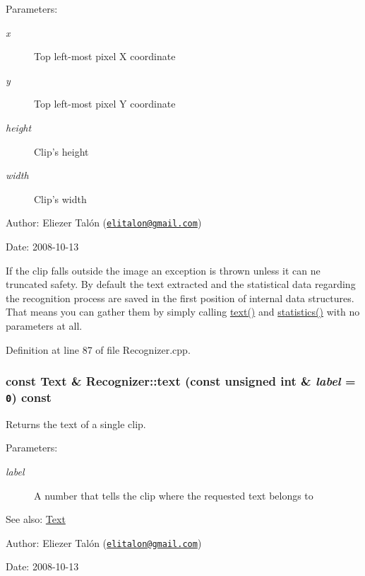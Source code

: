 \begin{Desc}
\item[Parameters:]
\begin{description}
\item[{\em x}]Top left-most pixel X coordinate \item[{\em y}]Top left-most pixel Y coordinate \item[{\em height}]Clip's height \item[{\em width}]Clip's width\end{description}
\end{Desc}
\begin{Desc}
\item[Author:]Eliezer Talón (\href{mailto:elitalon@gmail.com}{\tt elitalon@gmail.com}) \end{Desc}
\begin{Desc}
\item[Date:]2008-10-13\end{Desc}
If the clip falls outside the image an exception is thrown unless it can ne truncated safety. By default the text extracted and the statistical data regarding the recognition process are saved in the first position of internal data structures. That means you can gather them by simply calling \hyperlink{class_recognizer_c5d20b511888a60a6c1a81c0a4206ec2}{text()} and \hyperlink{class_recognizer_8b38356d2741969e67cd6b4f507897ba}{statistics()} with no parameters at all. 

Definition at line 87 of file Recognizer.cpp.\hypertarget{class_recognizer_c5d20b511888a60a6c1a81c0a4206ec2}{
\subsubsection[text]{\setlength{\rightskip}{0pt plus 5cm}const {\bf Text} \& Recognizer::text (const unsigned int \& {\em label} = {\tt 0}) const}}
\label{class_recognizer_c5d20b511888a60a6c1a81c0a4206ec2}


Returns the text of a single clip. 

\begin{Desc}
\item[Parameters:]
\begin{description}
\item[{\em label}]A number that tells the clip where the requested text belongs to\end{description}
\end{Desc}
\begin{Desc}
\item[See also:]\hyperlink{class_text}{Text}\end{Desc}
\begin{Desc}
\item[Author:]Eliezer Talón (\href{mailto:elitalon@gmail.com}{\tt elitalon@gmail.com}) \end{Desc}
\begin{Desc}
\item[Date:]2008-10-13 \end{Desc}


